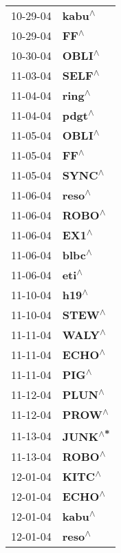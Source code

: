 \begin{supertabular}{p{0.08\textwidth}p{0.2\textwidth}}
 10-29-04 &    \textbf{kabu\textsuperscript{$\wedge$}} \\
 10-29-04 &      \textbf{FF\textsuperscript{$\wedge$}} \\
 10-30-04 &    \textbf{OBLI\textsuperscript{$\wedge$}} \\
 11-03-04 &    \textbf{SELF\textsuperscript{$\wedge$}} \\
 11-04-04 &    \textbf{ring\textsuperscript{$\wedge$}} \\
 11-04-04 &    \textbf{pdgt\textsuperscript{$\wedge$}} \\
 11-05-04 &    \textbf{OBLI\textsuperscript{$\wedge$}} \\
 11-05-04 &      \textbf{FF\textsuperscript{$\wedge$}} \\
 11-05-04 &    \textbf{SYNC\textsuperscript{$\wedge$}} \\
 11-06-04 &    \textbf{reso\textsuperscript{$\wedge$}} \\
 11-06-04 &    \textbf{ROBO\textsuperscript{$\wedge$}} \\
 11-06-04 &     \textbf{EX1\textsuperscript{$\wedge$}} \\
 11-06-04 &    \textbf{blbc\textsuperscript{$\wedge$}} \\
 11-06-04 &     \textbf{eti\textsuperscript{$\wedge$}} \\
 11-10-04 &     \textbf{h19\textsuperscript{$\wedge$}} \\
 11-10-04 &    \textbf{STEW\textsuperscript{$\wedge$}} \\
 11-11-04 &    \textbf{WALY\textsuperscript{$\wedge$}} \\
 11-11-04 &    \textbf{ECHO\textsuperscript{$\wedge$}} \\
 11-11-04 &     \textbf{PIG\textsuperscript{$\wedge$}} \\
 11-12-04 &    \textbf{PLUN\textsuperscript{$\wedge$}} \\
 11-12-04 &    \textbf{PROW\textsuperscript{$\wedge$}} \\
 11-13-04 &   \textbf{JUNK\textsuperscript{$\wedge$*}} \\
 11-13-04 &    \textbf{ROBO\textsuperscript{$\wedge$}} \\
 12-01-04 &    \textbf{KITC\textsuperscript{$\wedge$}} \\
 12-01-04 &    \textbf{ECHO\textsuperscript{$\wedge$}} \\
 12-01-04 &    \textbf{kabu\textsuperscript{$\wedge$}} \\
 12-01-04 &    \textbf{reso\textsuperscript{$\wedge$}} \\

\end{supertabular}
